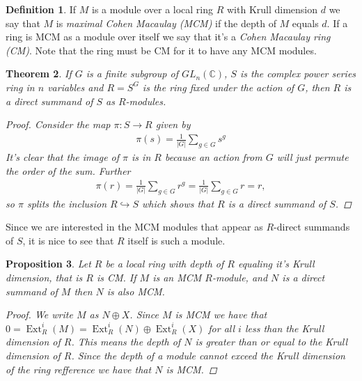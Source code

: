 \documentclass[11pt, a4paper, english]{article}
\newtheorem{theorem}{Theorem}[section]
\newtheorem{prop}[theorem]{Proposition}
\theoremstyle{definition}
\newtheorem{defin}[theorem]{Definition}
\newcommand{\C}{\mathbb{C}}
\DeclareMathOperator{\Ext}{Ext}
\begin{document}
\begin{defin}
If $M$ is a module over a local ring $R$ with Krull dimension $d$ we say that $M$ is \textit{maximal Cohen Macaulay (MCM)} if the depth of $M$ equals $d$. If a ring is MCM as a module over itself we say that it's a \textit{Cohen Macaulay ring (CM)}. Note that the ring must be CM for it to have any MCM modules.
\end{defin}

\begin{theorem}
If $G$ is a finite subgroup of $GL_n(\C)$, $S$ is the complex power series ring in $n$ variables and $R = S^G$ is the ring fixed under the action of $G$, then $R$ is a direct summand of $S$ as $R$-modules.

\begin{proof}
Consider the map $\pi: S \to R$ given by
\begin{align*}
\pi(s) = \frac{1}{|G|} \sum_{g\in G} s^g
\end{align*}
It's clear that the image of $\pi$ is in $R$ because an action from $G$ will just permute the order of the sum. Further \begin{align*}
\pi(r) = \frac{1}{|G|} \sum_{g\in G} r^g = \frac{1}{|G|} \sum_{g\in G} r = r,
\end{align*}
so $\pi$ splits the inclusion $R \hookrightarrow S$ which shows that $R$ is a direct summand of $S$.
\end{proof}
\end{theorem}

Since we are interested in the MCM modules that appear as $R$-direct summands of $S$, it is nice to see that $R$ itself is such a module.

\begin{prop}
\label{prop:direct_summand_MCM}
Let $R$ be a local ring with depth of $R$ equaling it's Krull dimension, that is $R$ is CM. If $M$ is an MCM $R$-module, and $N$ is a direct summand of $M$ then $N$ is also MCM.
\begin{proof}
We write $M$ as $N \oplus X$. Since $M$ is MCM we have that $0 = \Ext^i_R(M) = \Ext^i_R(N) \oplus \Ext^i_R(X)$ for all $i$ less than the Krull dimension of $R$. This means the depth of $N$ is greater than or equal to the Krull dimension of $R$. Since the depth of a module cannot exceed the Krull dimension of the ring {\color{red} refference} we have that $N$ is MCM.
\end{proof}
\end{prop}
\end{document}
